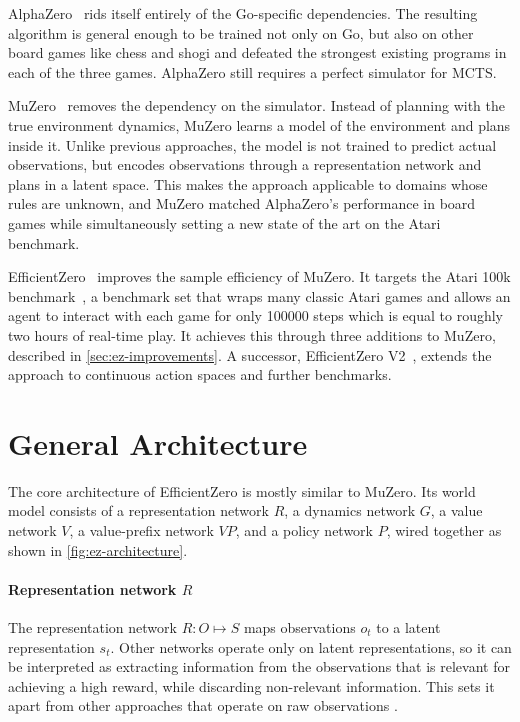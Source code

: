 AlphaZero~\cite{silver_general_2018} rids itself entirely of the Go-specific dependencies.
The resulting algorithm is general enough to be trained not only on Go, but
also on other board games like chess and shogi and defeated the strongest
existing programs in each of the three games.
AlphaZero still requires a perfect simulator for MCTS.

MuZero~\cite{schrittwieser_mastering_2020} removes the dependency on the simulator.
Instead of planning with the true environment dynamics, MuZero learns a model
of the environment and plans inside it.
Unlike previous approaches, the model is not trained to predict actual observations,
but encodes observations through a representation network and plans in a latent space.
This makes the approach applicable to domains whose rules are unknown, and
MuZero matched AlphaZero's performance in board games while simultaneously
setting a new state of the art on the Atari benchmark.

EfficientZero~\cite{ye_mastering_2021} improves the sample efficiency of MuZero.
It targets the Atari 100k benchmark~\cite{kaiser_model-based_2024}, a benchmark
set that wraps many classic Atari games and allows an agent to interact with each
game for only \num{100000} steps which is equal to roughly two hours of real-time play.
It achieves this through three additions to MuZero, described in
\cref{sec:ez-improvements}.
A successor, EfficientZero V2~\cite{wang_efficientzero_2024}, extends the
approach to continuous action spaces and further benchmarks.

\section{General Architecture}\label{sec:ez-architecture}

The core architecture of EfficientZero is mostly similar to MuZero.
Its world model consists of a representation network $R$, a dynamics network $G$,
a value network $V$, a value-prefix network $VP$, and a policy network $P$,
wired together as shown in \cref{fig:ez-architecture}.



\paragraph{Representation network $R$}
The representation network $R:O\mapsto S$ maps observations $o_t$ to a latent
representation $s_t$.
Other networks operate only on latent representations, so it can be interpreted
as extracting information from the observations that is relevant for achieving
a high reward, while discarding non-relevant information.
This sets it apart from other approaches that operate on raw observations .

